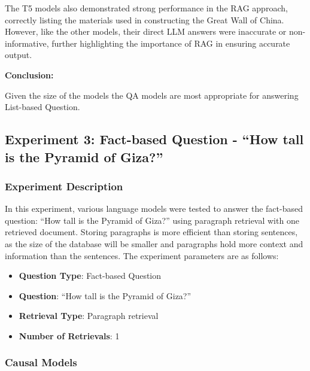 \documentclass{wseas}
\begin{document}
The T5 models also demonstrated strong performance in the RAG approach,
correctly listing the materials used in constructing the Great Wall of
China. However, like the other models, their direct LLM answers were
inaccurate or non-informative, further highlighting the importance of
RAG in ensuring accurate output.

\textbf{Conclusion:}

Given the size of the models the QA models are most appropriate for
answering List-based Question.


\subsection{Experiment 3: Fact-based Question - ``How tall is the
Pyramid of
Giza?''}

\subsubsection{Experiment Description}

In this experiment, various language models were tested to answer the
fact-based question: ``How tall is the Pyramid of Giza?'' using
paragraph retrieval with one retrieved document. Storing paragraphs is
more efficient than storing sentences, as the size of the database will
be smaller and paragraphs hold more context and information than the
sentences. The experiment parameters are as follows:

\begin{itemize}

\item
  \textbf{Question Type}: Fact-based Question
\item
  \textbf{Question}: ``How tall is the Pyramid of Giza?''
\item
  \textbf{Retrieval Type}: Paragraph retrieval
\item
  \textbf{Number of Retrievals}: 1
\end{itemize}

\subsubsection{Causal Models}
\end{document}
